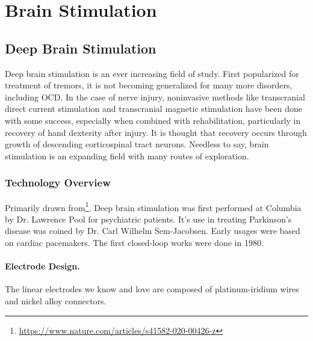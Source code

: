 \chapter{Brain Stimulation}


\section{Deep Brain Stimulation}

Deep brain stimulation is an ever increasing field of study. First popularized for treatment of tremors, it is not becoming generalized for many more disorders, including OCD. In the case of nerve injury, noninvasive methods like transcranial direct current stimulation and transcranial magnetic stimulation have been done with some success, especially when combined with rehabilitation, particularly in recovery of hand dexterity after injury. It is thought that recovery occurs through growth of descending corticospinal tract neurons. Needless to say, brain stimulation is an expanding field with many routes of exploration. 

\subsection{Technology Overview}

Primarily drawn from\footnote{\url{https://www.nature.com/articles/s41582-020-00426-z}}. Deep brain stimulation was first performed at Columbia by Dr. Lawrence Pool for psychiatric patients. It's use in treating Parkinson's disease was coined by Dr. Carl Wilhelm Sem-Jacobsen. Early usages were based on cardiac pacemakers. The first closed-loop works were done in 1980.

\subsubsection{Electrode Design.}

The linear electrodes we know and love are composed of platinum-iridium wires and  nickel alloy connectors. 

